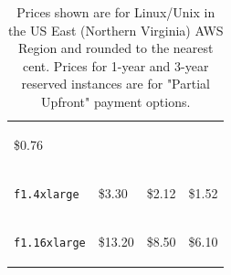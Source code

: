\documentclass[a4paper]{article}
\begin{document}
\begin{table}[!htp]
\begin{tabular}{@{} p{5em} p{7em} p{9.5em} p{9.5em} @{}}
\begin{center}
                \vspace{-1.5em}
                \$0.76
            \end{center} \\
            \begin{center}
                \vspace{-2.5em}
                \texttt{f1.4xlarge}
            \end{center} &
            \begin{center}
                \vspace{-2em}
                \$3.30
            \end{center} & 
            \begin{center}
                \vspace{-2em}
                \$2.12
            \end{center} & 
            \begin{center}
                \vspace{-2em}
                \$1.52
            \end{center} \\
            \begin{center}
                \vspace{-2.5em}
                \texttt{f1.16xlarge}
                \vspace{-2em}
            \end{center} &
            \begin{center}
                \vspace{-2em}
                \$13.20
                \vspace{-2em}
            \end{center} & 
            \begin{center}
                \vspace{-2em}
                \$8.50
                \vspace{-2em}
            \end{center} & 
            \begin{center}
                \vspace{-2em}
                \$6.10
                \vspace{-2em}
            \end{center} \\
            \bottomrule
        \end{tabular}
        \caption{Prices shown are for Linux/Unix in the US East (Northern Virginia) AWS Region and rounded to the nearest cent. Prices for 1-year and 3-year reserved instances are for "Partial Upfront" payment options.}
        \label{tab: how much ec2 f1 costs}
    \end{table}
\end{document}
